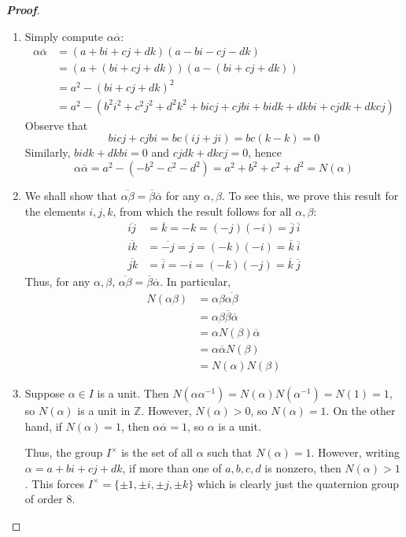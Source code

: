 \documentclass[12pt,leqno]{book}
\theoremstyle{definition}
\newcommand{\Z}{\mathbb{Z}}
\newenvironment{Proof}{\begin{proof}[\textnormal{\textbf{Proof}}]}{\end{proof}}
\begin{document}
\begin{enumerate}
\begin{Proof}
\begin{enumerate}
 \item Simply compute $\alpha\overline{\alpha}$:\begin{align*}\alpha\overline{\alpha}&=(a+bi+cj+dk)(a-bi-cj-dk)\\&=(a+(bi+cj+dk))(a-(bi+cj+dk))\\&=a^2-(bi+cj+dk)^2\\&=a^2-\left(b^2i^2+c^2j^2+d^2k^2+bicj+cjbi+bidk+dkbi+cjdk+dkcj\right)\end{align*} Observe that \[bicj+cjbi=bc(ij+ji)=bc(k-k)=0\] Similarly, $bidk+dkbi=0$ and $cjdk+dkcj=0$, hence \[\alpha\overline{\alpha}=a^2-(-b^2-c^2-d^2)=a^2+b^2+c^2+d^2=N(\alpha)\]
 \item We shall show that $\overline{\alpha\beta}=\overline{\beta}\overline{\alpha}$ for any $\alpha,\beta$. To see this, we prove this result for the elements $i,j,k$, from which the result follows for all $\alpha,\beta$: \begin{align*}\overline{ij}&=\overline{k}=-k=(-j)(-i)=\overline{j}\:\overline{i}\\\overline{ik}&=\overline{-j}=j=(-k)(-i)=\overline{k}\:\overline{i}\\\overline{jk}&=\overline{i}=-i=(-k)(-j)=\overline{k}\:\overline{j}\end{align*} Thus, for any $\alpha,\beta$, $\overline{\alpha\beta}=\overline{\beta}\overline{\alpha}$. In particular, \begin{align*}N(\alpha\beta)&=\alpha\beta\overline{\alpha\beta}\\&=\alpha\beta\overline{\beta}\overline{\alpha}\\&=\alpha N(\beta)\overline{\alpha}\\&=\alpha\overline{\alpha}N(\beta)\\&=N(\alpha)N(\beta)\end{align*}
 \item Suppose $\alpha\in I$ is a unit. Then $N(\alpha\alpha^{-1})=N(\alpha)N(\alpha^{-1})=N(1)=1$, so $N(\alpha)$ is a unit in $\Z$. However, $N(\alpha)>0$, so $N(\alpha)=1$. On the other hand, if $N(\alpha)=1$, then $\alpha\overline{\alpha}=1$, so $\alpha$ is a unit.

Thus, the group $I^{\times}$ is the set of all $\alpha$ such that $N(\alpha)=1$. However, writing $\alpha=a+bi+cj+dk$, if more than one of $a,b,c,d$ is nonzero, then $N(\alpha)>1$. This forces $I^{\times}=\{\pm1,\pm i,\pm j,\pm k\}$ which is clearly just the quaternion group of order 8.
\end{enumerate}


\end{Proof}
\end{enumerate}
\end{document}
